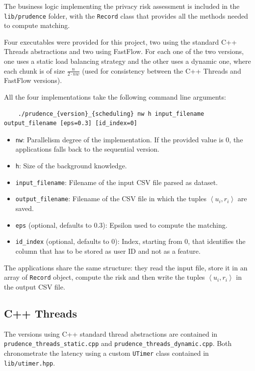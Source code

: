 \documentclass[a4paper]{article}
\begin{document}
The business logic implementing the privacy risk assessment is included in the \texttt{lib/prudence} folder, with the \texttt{Record} class that provides all the methods needed to compute matching.

Four executables were provided for this project, two using the standard C++ Threads abstractions and two using FastFlow. For each one of the two versions, one uses a static load balancing strategy and the other uses a dynamic one, where each chunk is of size $\frac{n}{2 \cdot nw}$ (used for consistency between the C++ Threads and FastFlow versions).

All the four implementations take the following command line arguments:
\begin{verbatim}
    ./prudence_{version}_{scheduling} nw h input_filename output_filename [eps=0.3] [id_index=0]
\end{verbatim}
\begin{itemize}
    \item \texttt{nw}: Parallelism degree of the implementation. If the provided value is 0, the applications falls back to the sequential version.
    \item \texttt{h}: Size of the background knowledge.
    \item \texttt{input\_filename}: Filename of the input CSV file parsed as dataset.
    \item \texttt{output\_filename}: Filename of the CSV file in which the tuples $\left < u_i, r_i \right >$ are saved.
    \item \texttt{eps} (optional, defaults to 0.3): Epsilon used to compute the matching.
    \item \texttt{id\_index} (optional, defaults to 0): Index, starting from 0, that identifies the column that has to be stored as user ID and not as a feature.
\end{itemize}

The applications share the same structure: they read the input file, store it in an array of \texttt{Record} object, compute the risk and then write the tuples $\left < u_i, r_i \right >$ in the output CSV file.

\subsection{C++ Threads}

The versions using C++ standard thread abstractions are contained in \texttt{prudence\_threads\_static.cpp} and \texttt{prudence\_threads\_dynamic.cpp}. Both chronometrate the latency using a custom \texttt{UTimer} class contained in \texttt{lib/utimer.hpp}.
\end{document}
